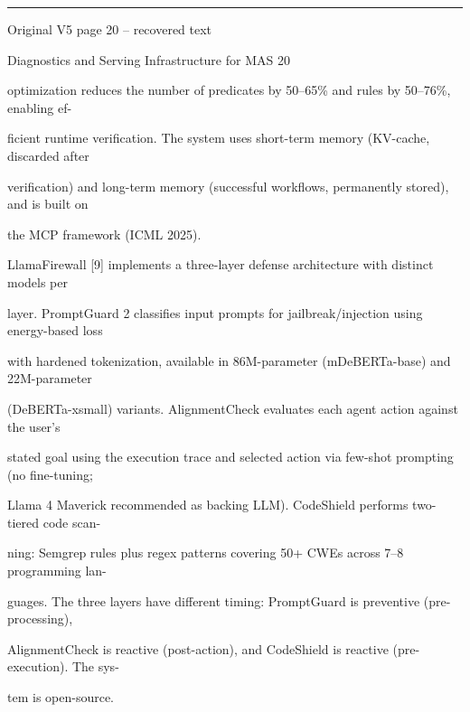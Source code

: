 \par\smallskip\noindent\rule{\textwidth}{0.4pt}\par{\sffamily\footnotesize Original V5 page 20 -- recovered text}\par\begin{flushleft}\footnotesize\ttfamily
\par\smallskip
\par\smallskip
\noindent Diagnostics and Serving Infrastructure for MAS 20\par
\par\smallskip
\par\smallskip
\par\smallskip
\noindent optimization reduces the number of predicates by 50–65\% and rules by 50–76\%, enabling ef-\par
\noindent ficient runtime verification. The system uses short-term memory (KV-cache, discarded after\par
\noindent verification) and long-term memory (successful workflows, permanently stored), and is built on\par
\noindent the MCP framework (ICML 2025).\par
\noindent  LlamaFirewall [9] implements a three-layer defense architecture with distinct models per\par
\noindent layer. PromptGuard 2 classifies input prompts for jailbreak/injection using energy-based loss\par
\noindent with hardened tokenization, available in 86M-parameter (mDeBERTa-base) and 22M-parameter\par
\noindent (DeBERTa-xsmall) variants. AlignmentCheck evaluates each agent action against the user’s\par
\noindent stated goal using the execution trace and selected action via few-shot prompting (no fine-tuning;\par
\noindent Llama 4 Maverick recommended as backing LLM). CodeShield performs two-tiered code scan-\par
\noindent ning: Semgrep rules plus regex patterns covering 50+ CWEs across 7–8 programming lan-\par
\noindent guages. The three layers have different timing: PromptGuard is preventive (pre-processing),\par
\noindent AlignmentCheck is reactive (post-action), and CodeShield is reactive (pre-execution). The sys-\par
\noindent tem is open-source.\par

\end{flushleft}
